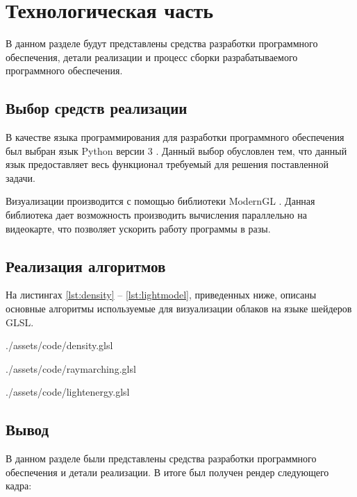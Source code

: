 \chapter{Технологическая часть}

В данном разделе будут представлены средства разработки программного обеспечения, детали реализации и процесс сборки разрабатываемого
программного обеспечения.

\section{Выбор средств реализации}

В качестве языка программирования для разработки программного обеспечения был выбран язык Python версии 3 \cite{python}. Данный выбор обусловлен тем, что данный язык предоставляет весь функционал требуемый для решения поставленной задачи. 

Визуализации производится с помощью библиотеки ModernGL \cite{modeengl}. Данная библиотека дает возможность производить вычисления параллельно на видеокарте, что позволяет ускорить работу программы в разы. 


\section{Реализация алгоритмов}

На листингах \ref{lst:density} -- \ref{lst:lightmodel}, приведенных ниже, описаны основные алгоритмы используемые для визуализации облаков на языке шейдеров GLSL.

\clearpage

\begin{lstinputlisting}[
	caption={Реализация функции определяющей плотность в точке},
	language=GLSL,
	label={lst:density},
	linerange={1-172,311-311}
	]{./assets/code/density.glsl}
\end{lstinputlisting}


\clearpage

\begin{lstinputlisting}[
	caption={Реализация алгоритма Ray Marching},
	language=GLSL,
	label={lst:raymarching},
	linerange={1-172,311-311}
	]{./assets/code/raymarching.glsl}
\end{lstinputlisting}


\clearpage

\begin{lstinputlisting}[
	caption={Реализация модели освещения},
	language=GLSL,
	label={lst:lightmodel},
	linerange={1-172,311-311}
	]{./assets/code/lightenergy.glsl}
\end{lstinputlisting}


\section{Вывод}

В данном разделе были представлены средства разработки программного обеспечения и детали реализации. В итоге был получен рендер следующего кадра:

